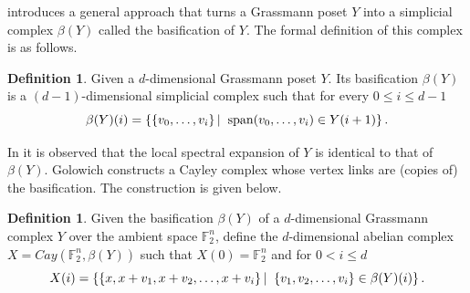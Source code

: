 \documentclass[10pt,a4paper]{article}
\theoremstyle{definition}
\newtheorem{definition}[theorem]{Definition}
\theoremstyle{remark}
\newcommand{\Authornotecolored}[3]{{\sffamily\small\color{#1}{[#2: #3]}}}
\newcommand{\Authornotecolored}[3]{}
\newcommand{\Snote}{\Authornotecolored{Green}{S}}
\newcommand{\snote}{\Snote}
\newcommand\sett[2]{\left\{ #1 \left| \; \vphantom{#1 #2} \right. #2  \right\}}
\newcommand{\set}[1]{\{#1\}}
\def\sp{\mathrm{ span}}
\newcommand{\F}{\mathbb{F}}
\renewcommand{\le}{\leqslant}
\numberwithin{equation}{section}
\def\S{X}
\def\dimm{\ell}
\begin{document}
\medskip

\cite{Golowich2023} introduces a general approach that turns a Grassmann poset $Y$ into a simplicial complex \(\beta(Y)\) called the basification of $Y$. The formal definition of this complex is as follows.

\begin{definition}\label{def:basification}
    Given a $d$-dimensional Grassmann poset $Y$. Its basification $\beta(Y)$ is a $(d-1)$-dimensional simplicial complex such that for every $0\le i \le d-1$
    \[ \beta(Y)(i) = \sett{ \set{v_0,\dots,v_i}}{\sp (v_0,\dots,v_i) \in Y(i+1)}.\]
\end{definition}

In \cite{Golowich2023} it is observed that the local spectral expansion of \(Y\) is identical to that of \(\beta(Y)\). Golowich constructs a Cayley complex whose vertex links are (copies of) the basification. The construction is given below.

\begin{definition}\label{def:abelian-complex-from-basification}
    Given the basification $\beta(Y)$ of a $d$-dimensional Grassmann complex $Y$ over the ambient space $\F_2^n$, define the $d$-dimensional abelian complex $\S = Cay(\F_2^n, \beta(Y))$ such that $\S(0) = \F_2^n$ and for $0<i\le d$
    \[\S(i) = \sett{\set{x,x+v_1,x+v_2,\dots,x+v_i}}{\set{v_1,v_2,\dots,v_i} \in \beta(Y)(i)}.\]
\end{definition}

\end{document}
